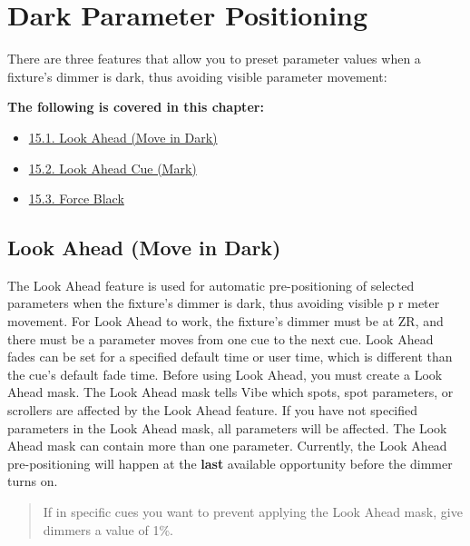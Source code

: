 \documentclass[
]{article}
\providecommand{\tightlist}{%
  \setlength{\itemsep}{0pt}\setlength{\parskip}{0pt}}
\begin{document}
\hypertarget{dark-parameter-positioning}{%
\section{Dark Parameter Positioning}\label{dark-parameter-positioning}}

There are three features that allow you to preset parameter values when a fixture's dimmer is dark, thus avoiding visible parameter movement:

\textbf{The following is covered in this chapter:}

\begin{itemize}
\tightlist
\item
  \href{https://vibemanual.compulite.com/dark-parameter-positioning.html\#look-ahead-move-in-dark}{15.1. Look Ahead (Move in Dark)}
\item
  \href{https://vibemanual.compulite.com/dark-parameter-positioning.html\#look-ahead-cue-mark}{15.2. Look Ahead Cue (Mark)}
\item
  \href{https://vibemanual.compulite.com/dark-parameter-positioning.html\#force-black}{15.3. Force Black}
\end{itemize}

\hypertarget{look-ahead-move-in-dark}{%
\subsection{Look Ahead (Move in Dark)}\label{look-ahead-move-in-dark}}

The Look Ahead feature is used for automatic pre-positioning of selected parameters when the fixture's dimmer is dark, thus avoiding visible p r meter movement. For Look Ahead to work, the fixture's dimmer must be at ZR, and there must be a parameter moves from one cue to the next cue. Look Ahead fades can be set for a specified default time or user time, which is different than the cue's default fade time. Before using Look Ahead, you must create a Look Ahead mask. The Look Ahead mask tells Vibe which spots, spot parameters, or scrollers are affected by the Look Ahead feature. If you have not specified parameters in the Look Ahead mask, all parameters will be affected. The Look Ahead mask can contain more than one parameter. Currently, the Look Ahead pre-positioning will happen at the \textbf{last} available opportunity before the dimmer turns on.

\begin{quote}
If in specific cues you want to prevent applying the Look Ahead mask, give dimmers a value of 1\%.
\end{quote}
\end{document}
